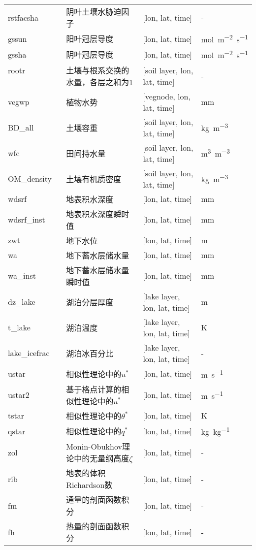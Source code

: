 {\begin{longtable}[htbp]{lp{}p{}l}
rstfacsha ~ ~ & 阴叶土壤水胁迫因子 & {[}lon, lat, time{]}  & - \\
gssun & 阳叶冠层导度 &  {[}lon, lat, time{]} & \unit{mol.m^{-2}.s^{-1}} \\
gssha & 阴叶冠层导度 &  {[}lon, lat, time{]} & \unit{mol.m^{-2}.s^{-1}} \\
rootr ~ ~ ~ ~ ~ ~ ~ & 土壤与根系交换的水量，各层之和为1 & {[}soil layer, lon, lat, time{]}  & - \\
vegwp & 植物水势 & {[}vegnode, lon, lat, time{]}  & mm \\ %
BD\_all & 土壤容重 &  {[}soil layer, lon, lat, time{]} & \unit{kg.m^{-3}} \\
wfc & 田间持水量 &  {[}soil layer, lon, lat, time{]} & \unit{m^{3}.m^{-3}} \\
OM\_density & 土壤有机质密度 &  {[}soil layer, lon, lat, time{]} & \unit{kg.m^{-3}} \\
wdsrf & 地表积水深度 & {[}lon, lat, time{]}  & mm \\
wdsrf\_inst & 地表积水深度瞬时值 & {[}lon, lat, time{]}  & mm \\
zwt & 地下水位 & {[}lon, lat, time{]}  & m \\
wa & 地下蓄水层储水量 & {[}lon, lat, time{]}  & mm \\
wa\_inst & 地下蓄水层储水量瞬时值 & {[}lon, lat, time{]}  & mm \\
dz\_lake & 湖泊分层厚度 & {[}lake layer, lon, lat, time{]}  & m \\
t\_lake & 湖泊温度 & {[}lake layer, lon, lat, time{]}  & K \\
lake\_icefrac & 湖泊冰百分比 & {[}lake layer, lon, lat, time{]} & - \\
ustar~ ~ & 相似性理论中的$u^*$ & {[}lon, lat, time{]}  & \unit{m.s^{-1}} \\
ustar2~ ~ & 基于格点计算的相似性理论中的$u^*$ & {[}lon, lat, time{]}  & \unit{m.s^{-1}} \\
tstar~ ~ & 相似性理论中的$\theta ^*$ & {[}lon, lat, time{]}  & K \\
qstar~ ~ & 相似性理论中的$q^*$ & {[}lon, lat, time{]}  & \unit{kg.kg^{-1}} \\
zol~ ~ ~ & Monin-Obukhov理论中的无量纲高度$\zeta$ & {[}lon, lat, time{]} & - \\
rib~ ~ ~ & 地表的体积Richardson数 & {[}lon, lat, time{]}  & - \\
fm ~ ~ ~ & 通量的剖面函数积分 & {[}lon, lat, time{]}  & - \\
fh ~ ~ ~ & 热量的剖面函数积分 & {[}lon, lat, time{]}  & - \\

\end{longtable}}
